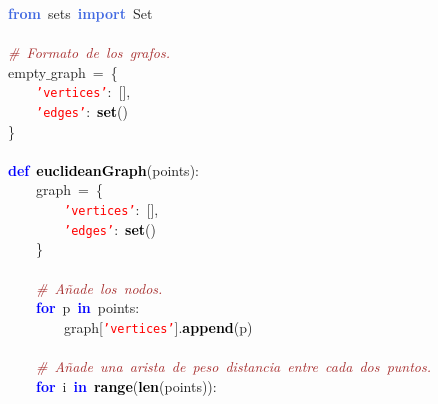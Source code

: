 \noindent
\mbox{}\textbf{\textcolor{RoyalBlue}{from}}\ sets\ \textbf{\textcolor{RoyalBlue}{import}}\ Set \\
\mbox{} \\
\mbox{}\textit{\textcolor{Brown}{\#\ Formato\ de\ los\ grafos.}} \\
\mbox{}empty$\_$graph\ \textcolor{BrickRed}{=}\ \textcolor{BrickRed}{\{} \\
\mbox{}\ \ \ \ \texttt{\textcolor{Red}{'vertices'}}\textcolor{BrickRed}{:}\ \textcolor{BrickRed}{[],} \\
\mbox{}\ \ \ \ \texttt{\textcolor{Red}{'edges'}}\textcolor{BrickRed}{:}\ \textbf{\textcolor{Black}{set}}\textcolor{BrickRed}{()} \\
\mbox{}\textcolor{BrickRed}{\}} \\
\mbox{} \\
\mbox{}\textbf{\textcolor{Blue}{def}}\ \textbf{\textcolor{Black}{euclideanGraph}}\textcolor{BrickRed}{(}points\textcolor{BrickRed}{):} \\
\mbox{}\ \ \ \ graph\ \textcolor{BrickRed}{=}\ \textcolor{BrickRed}{\{} \\
\mbox{}\ \ \ \ \ \ \ \ \texttt{\textcolor{Red}{'vertices'}}\textcolor{BrickRed}{:}\ \textcolor{BrickRed}{[],} \\
\mbox{}\ \ \ \ \ \ \ \ \texttt{\textcolor{Red}{'edges'}}\textcolor{BrickRed}{:}\ \textbf{\textcolor{Black}{set}}\textcolor{BrickRed}{()} \\
\mbox{}\ \ \ \ \textcolor{BrickRed}{\}} \\
\mbox{} \\
\mbox{}\ \ \ \ \textit{\textcolor{Brown}{\#\ Añade\ los\ nodos.}} \\
\mbox{}\ \ \ \ \textbf{\textcolor{Blue}{for}}\ p\ \textbf{\textcolor{Blue}{in}}\ points\textcolor{BrickRed}{:} \\
\mbox{}\ \ \ \ \ \ \ \ graph\textcolor{BrickRed}{[}\texttt{\textcolor{Red}{'vertices'}}\textcolor{BrickRed}{].}\textbf{\textcolor{Black}{append}}\textcolor{BrickRed}{(}p\textcolor{BrickRed}{)} \\
\mbox{}\ \ \ \  \\
\mbox{}\ \ \ \ \textit{\textcolor{Brown}{\#\ Añade\ una\ arista\ de\ peso\ distancia\ entre\ cada\ dos\ puntos.}} \\
\mbox{}\ \ \ \ \textbf{\textcolor{Blue}{for}}\ i\ \textbf{\textcolor{Blue}{in}}\ \textbf{\textcolor{Black}{range}}\textcolor{BrickRed}{(}\textbf{\textcolor{Black}{len}}\textcolor{BrickRed}{(}points\textcolor{BrickRed}{)):}\  \\
